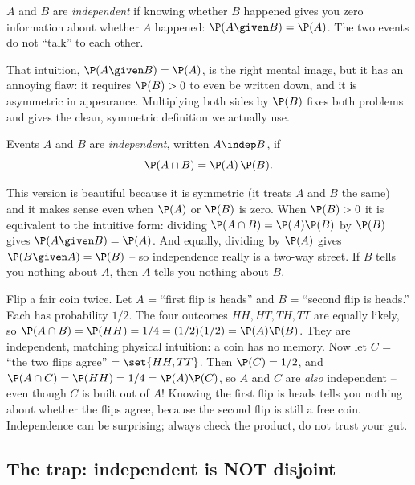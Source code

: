\begin{intuitionbox}
$A$ and $B$ are \emph{independent} if knowing whether $B$ happened gives you zero information about whether $A$ happened: $\P(A\given B) = \P(A)$. The two events do not ``talk'' to each other.
\end{intuitionbox}

That intuition, $\P(A \given B) = \P(A)$, is the right mental image, but it has an annoying flaw: it requires $\P(B) > 0$ to even be written down, and it is asymmetric in appearance. Multiplying both sides by $\P(B)$ fixes both problems and gives the clean, symmetric definition we actually use.

\begin{definition}
\label{ch04:def-indep}
Events $A$ and $B$ are \emph{independent}, written $A \indep B$, if
\[
\P(A \cap B) = \P(A)\,\P(B).
\]
\end{definition}

This version is beautiful because it is symmetric (it treats $A$ and $B$ the same) and it makes sense even when $\P(A)$ or $\P(B)$ is zero. When $\P(B) > 0$ it is equivalent to the intuitive form: dividing $\P(A\cap B) = \P(A)\P(B)$ by $\P(B)$ gives $\P(A\given B) = \P(A)$. And equally, dividing by $\P(A)$ gives $\P(B\given A) = \P(B)$ -- so independence really is a two-way street. If $B$ tells you nothing about $A$, then $A$ tells you nothing about $B$.

\begin{example}
\label{ch04:ex-two-coins}
Flip a fair coin twice. Let $A$ = ``first flip is heads'' and $B$ = ``second flip is heads.'' Each has probability $1/2$. The four outcomes $HH, HT, TH, TT$ are equally likely, so $\P(A\cap B) = \P(HH) = 1/4 = (1/2)(1/2) = \P(A)\P(B)$. They are independent, matching physical intuition: a coin has no memory. Now let $C$ = ``the two flips agree'' $= \set{HH, TT}$. Then $\P(C) = 1/2$, and $\P(A \cap C) = \P(HH) = 1/4 = \P(A)\P(C)$, so $A$ and $C$ are \emph{also} independent -- even though $C$ is built out of $A$! Knowing the first flip is heads tells you nothing about whether the flips agree, because the second flip is still a free coin. Independence can be surprising; always check the product, do not trust your gut.
\end{example}

\subsection{The trap: independent is NOT disjoint}

